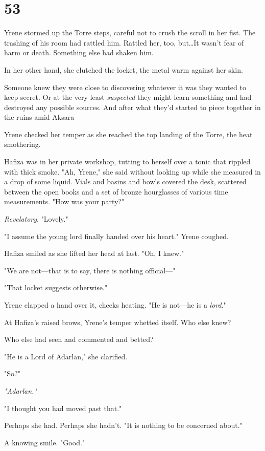 
\chapter{53}

Yrene stormed up the Torre steps, careful not to crush the scroll in her fist. The trashing of his room had rattled him. Rattled her, too, but\ldots It wasn't fear of harm or death. Something else had shaken him.

In her other hand, she clutched the locket, the metal warm against her skin.

Someone knew they were close to discovering whatever it was they wanted to keep secret. Or at the very least \emph{suspected} they might learn something and had destroyed any possible sources. And after what they'd started to piece together in the ruins amid Aksara 

Yrene checked her temper as she reached the top landing of the Torre, the heat smothering.

Hafiza was in her private workshop, tutting to herself over a tonic that rippled with thick smoke. "Ah, Yrene," she said without looking up while she measured in a drop of some liquid. Vials and basins and bowls covered the desk, scattered between the open books and a set of bronze hourglasses of various time measurements. "How was your party?"

\emph{Revelatory}. "Lovely."

"I assume the young lord finally handed over his heart." Yrene coughed.

Hafiza smiled as she lifted her head at last. "Oh, I knew."

"We are not---that is to say, there is nothing official---"

"That locket suggests otherwise."

Yrene clapped a hand over it, cheeks heating. "He is not---he is a
\emph{lord}."

At Hafiza's raised brows, Yrene's temper whetted itself. Who else knew?

Who else had seen and commented and betted?

"He is a Lord of Adarlan," she clarified.

"So?"

\emph{"Adarlan."}

"I thought you had moved past that."

Perhaps she had. Perhaps she hadn't. "It is nothing to be concerned about."

A knowing smile. "Good."

